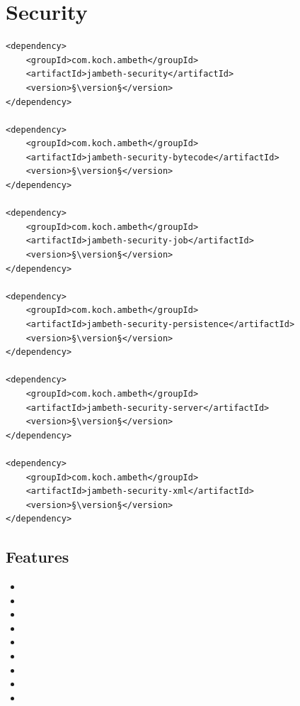 \section{Security}
\label{module:Security}
\ClearAPI
\TODO
\begin{lstlisting}[style=POM,caption={Maven modules to use \emph{Ambeth Security}}]
<dependency>
	<groupId>com.koch.ambeth</groupId>
	<artifactId>jambeth-security</artifactId>
	<version>§\version§</version>
</dependency>

<dependency>
	<groupId>com.koch.ambeth</groupId>
	<artifactId>jambeth-security-bytecode</artifactId>
	<version>§\version§</version>
</dependency>

<dependency>
	<groupId>com.koch.ambeth</groupId>
	<artifactId>jambeth-security-job</artifactId>
	<version>§\version§</version>
</dependency>

<dependency>
	<groupId>com.koch.ambeth</groupId>
	<artifactId>jambeth-security-persistence</artifactId>
	<version>§\version§</version>
</dependency>

<dependency>
	<groupId>com.koch.ambeth</groupId>
	<artifactId>jambeth-security-server</artifactId>
	<version>§\version§</version>
</dependency>

<dependency>
	<groupId>com.koch.ambeth</groupId>
	<artifactId>jambeth-security-xml</artifactId>
	<version>§\version§</version>
</dependency>
\end{lstlisting}
\subsection{Features}
\begin{itemize}
	\item {}
	\item {}
	\item {}
	\item {}
	\item {}
	\item {}
	\item {}
	\item {}
	\item {}
\end{itemize}

